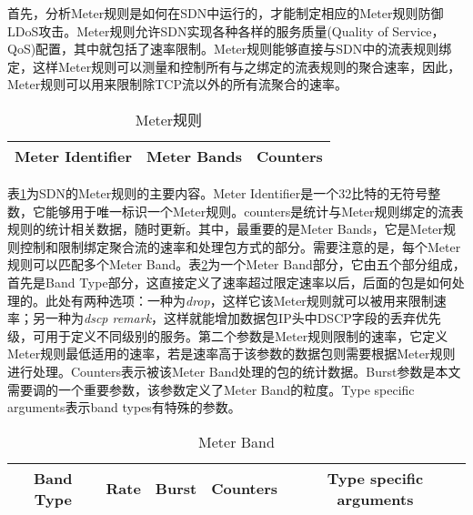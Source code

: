 首先，分析Meter规则是如何在SDN中运行的，才能制定相应的Meter规则防御LDoS攻击。Meter规则允许SDN实现各种各样的服务质量(Quality of Service，QoS)配置，其中就包括了速率限制。Meter规则能够直接与SDN中的流表规则绑定，这样Meter规则可以测量和控制所有与之绑定的流表规则的聚合速率，因此，Meter规则可以用来限制除TCP流以外的所有流聚合的速率。

\begin{table}[htbp]
	\centering  %
	\caption{Meter规则}  %
	\label{table:meter}  %
	\begin{tabular}{|c|c|c|}  
		\hline  %
        Meter Identifier & Meter Bands& Counters \\  %
        \hline
		
	\end{tabular}
\end{table}
表\ref{table:meter}为SDN的Meter规则的主要内容。Meter Identifier是一个32比特的无符号整数，它能够用于唯一标识一个Meter规则。counters是统计与Meter规则绑定的流表规则的统计相关数据，随时更新。其中，最重要的是Meter Bands，它是Meter规则控制和限制绑定聚合流的速率和处理包方式的部分。需要注意的是，每个Meter规则可以匹配多个Meter Band。表\ref{table:meterbands}为一个Meter Band部分，它由五个部分组成，首先是Band Type部分，这直接定义了速率超过限定速率以后，后面的包是如何处理的。此处有两种选项：一种为\emph{drop}，这样它该Meter规则就可以被用来限制速率；另一种为\emph{dscp remark}，这样就能增加数据包IP头中DSCP字段的丢弃优先级，可用于定义不同级别的服务。第二个参数是Meter规则限制的速率，它定义Meter规则最低适用的速率，若是速率高于该参数的数据包则需要根据Meter规则进行处理。Counters表示被该Meter Band处理的包的统计数据。Burst参数是本文需要调的一个重要参数，该参数定义了Meter Band的粒度。Type specific arguments表示band types有特殊的参数。

\begin{table}[htbp]
	\centering  %
	\caption{Meter Band}  %
	\label{table:meterbands}  %
	\begin{tabular}{|c|c|c|c|c|}  
		\hline  %
        Band Type & Rate & Burst & Counters & Type specific arguments \\  %
        \hline
		
	\end{tabular}
\end{table}

